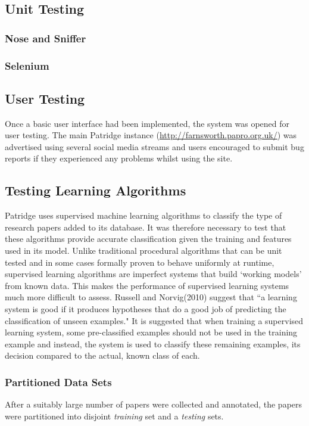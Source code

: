 %  
%

\subsection{ Unit Testing }

\subsubsection{ Nose and Sniffer }

\subsubsection{ Selenium }


\subsection{ User Testing } 

Once a basic user interface had been implemented, the system was opened for
user testing. The main Patridge instance
(\url{http://farnsworth.papro.org.uk/}) was advertised using several social
media streams and users encouraged to submit bug reports if they experienced
any problems whilst using the site.


\subsection{ Testing Learning Algorithms }

Patridge uses supervised machine learning algorithms to classify the type of
research papers added to its database. It was therefore necessary to test that
these algorithms provide accurate classification given the training and
features used in its model.  Unlike traditional procedural algorithms that can
be unit tested and in some cases formally proven to behave uniformly at
runtime\cite{filliatre2007formal}, supervised learning algorithms are imperfect
systems that build `working models' from known data. This makes the performance
of supervised learning systems much more difficult to assess. Russell and
Norvig(2010) suggest that ``a learning system is good if it produces hypotheses
that do a good job of predicting the classification of unseen
examples\cite{russell2010artificial}." It is suggested that when training a
supervised learning system, some pre-classified examples should not be used in
the training example and instead, the system is used to classify these
remaining examples, its decision compared to the actual, known class of
each\cite{alpaydin2004introduction}\cite{russell2010artificial}.

\subsubsection{ Partitioned Data Sets}

After a suitably large number of papers were collected and annotated, the
papers were partitioned into disjoint \emph{training} set and a \emph{testing}
sets. 
